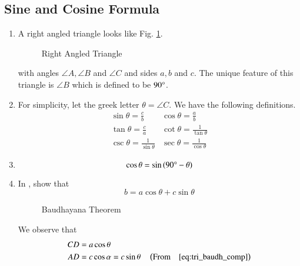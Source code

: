 %
\subsection{Sine and Cosine Formula}
\begin{enumerate}[label=\thesubsection.\arabic*.,ref=\thesubsection.\theenumi]
%
	\item 
A right angled triangle looks like Fig. \ref{fig:tri_right_angle}.
\begin{figure}[!ht]
\centering
\resizebox{0.6\columnwidth}{!}{}
\caption{Right Angled Triangle}
\label{fig:tri_right_angle}	
\end{figure}
with angles $\angle A,\angle B$ and $\angle C$ and sides $a, b$ and $c$.  The unique feature of this triangle is $\angle B$ which is defined to be $90\degree$.
\item
	For simplicity, let the greek letter $\theta = \angle C$.  We have the following definitions.
\begin{equation}
\label{eq:tri_trig_defs}
\begin{matrix}
	\sin \theta = \frac{c}{b} & 	\cos \theta = \frac{a}{b} \\[1ex]
	\tan \theta = \frac{c}{a} & \cot \theta = \frac{1}{\tan \theta} \\[1ex]
	\csc \theta = \frac{1}{\sin \theta} & \sec \theta = \frac{1}{\cos \theta}
	\end{matrix}
\end{equation}
\item  
	\begin{equation}
	\cos \theta = \sin \left(90\degree - \theta\right)
	\label{eq:tri_baudh_comp}	
	\end{equation}
\item
In  , 
show that 
%
\begin{equation}
\label{ch1_budh_basic}
b = a \cos \theta + c \sin \theta
\end{equation}
%
\begin{figure}[!ht]
	\begin{center}
		\resizebox{0.6\columnwidth}{!}{}
	\end{center}
	\caption{Baudhayana Theorem}
	\label{fig:tri_baudh}	
\end{figure}
\solution We observe that
%
\begin{align}
CD &= a \cos \theta \\
AD &= c \cos\alpha = c \sin \theta \quad \left(\text{From} \quad 
	\eqref{eq:tri_baudh_comp}	
\right)
\end{align}
\end{enumerate}
